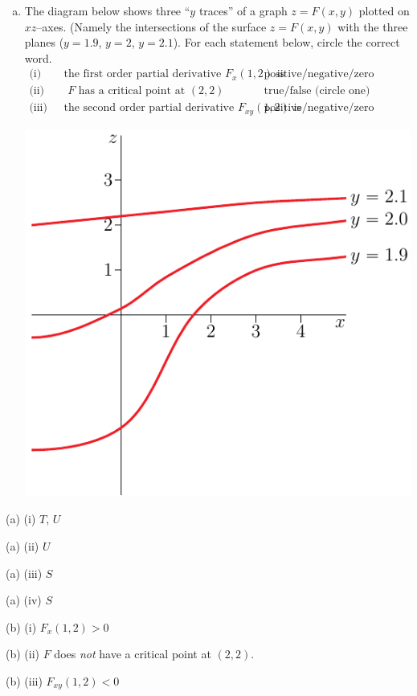 \begin{question}[M200 2016D]
\begin{enumerate}[(a)]
\item
The diagram below shows three ``$y$ traces'' of a graph $z=F(x,y)$ plotted
on $xz$--axes. (Namely the intersections of the surface  $z=F(x,y)$ with the 
three planes ($y=1.9$, $y=2$, $y=2.1$). For each statement below, circle the
correct word.
\begin{align*}
\text{(i) }& \text{ the first order partial derivative $F_x(1,2)$ is} & &\text{positive/negative/zero (circle one)} \\
\text{(ii) }& \text{ $F$ has a critical point at $(2,2)$ } & 
         &\text{true/false (circle one)} \\
\text{(iii) }& \text{ the second order partial derivative $F_{xy}(1,2)$ is} & &\text{positive/negative/zero (circle one)} 
\end{align*}

\begin{center}
     \includegraphics{fig/OE16D_2b.pdf}
\end{center}
\end{enumerate}
\end{question}

%

\begin{answer}
(a) (i) $T$, $U$

(a) (ii) $U$

(a) (iii) $S$

(a) (iv) $S$

(b) (i) $F_x(1,2)>0$

(b) (ii) $F$ does \emph{not} have a critical point at $(2,2)$.

(b) (iii) $F_{xy}(1,2)<0$
\end{answer}

